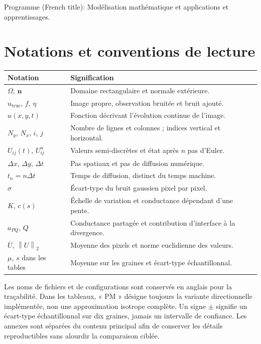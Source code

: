 \documentclass[11pt,a4paper,oneside]{report}
\newcommand{\norm}[1]{\left\lVert#1\right\rVert}
\newcommand{\utrue}{u_{\mathrm{true}}}
\newcommand{\dt}{\Delta t}
\newcommand{\dx}{\Delta x}
\newcommand{\dy}{\Delta y}
\begin{document}
\noindent Programme (French title):
\foreignlanguage{french}{Modélisation mathématique et applications et apprentissages}.
\begingroup
\small
\setlength{\parskip}{0pt}
\tableofcontents
\endgroup
\chapter*{Notations et conventions de lecture}
\noindent
\begin{tabularx}{\textwidth}{>{\raggedright\arraybackslash}p{3cm}X}
\toprule
Notation & Signification \\
\midrule
$\Omega$, $\boldsymbol n$ & Domaine rectangulaire et normale extérieure. \\
$\utrue$, $f$, $\eta$ & Image propre, observation bruitée et bruit ajouté. \\
$u(x,y,t)$ & Fonction décrivant l'évolution continue de l'image. \\
$N_y$, $N_x$, $i$, $j$ & Nombre de lignes et colonnes ; indices vertical et horizontal. \\
$U_{ij}(t)$, $U^n_{ij}$ & Valeurs semi-discrètes et état après $n$ pas d'Euler. \\
$\dx$, $\dy$, $\dt$ & Pas spatiaux et pas de diffusion numérique. \\
$t_n=n\dt$ & Temps de diffusion, distinct du temps machine. \\
$\sigma$ & Écart-type du bruit gaussien pixel par pixel. \\
$K$, $c(s)$ & Échelle de variation et conductance dépendant d'une pente. \\
$a_{PQ}$, $Q$ & Conductance partagée et contribution d'interface à la divergence. \\
$\overline U$, $\norm{U}_2$ & Moyenne des pixels et norme euclidienne des valeurs. \\
$\mu$, $s$ dans les tables & Moyenne sur les graines et écart-type échantillonnal. \\
\bottomrule
\end{tabularx}

Les noms de fichiers et de configurations sont conservés en anglais pour
la traçabilité. Dans les tableaux, « PM » désigne toujours la variante
directionnelle implémentée, non une approximation isotrope complète.
Un signe $\pm$ signifie un écart-type échantillonnal sur dix graines,
jamais un intervalle de confiance. Les annexes sont séparées du contenu
principal afin de conserver les détails reproductibles sans alourdir
la comparaison ciblée.
\clearpage
{}
\end{document}
